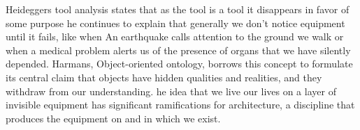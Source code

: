 Heideggers tool analysis states that as the tool is a tool it disappears in favor of some purpose he continues to explain that generally we don't notice equipment until it fails, like when An earthquake calls attention to the ground we walk or when a medical problem alerts us of the presence of organs that we have silently depended\cite{Harman2011}.
Harmans, Object-oriented ontology, borrows this concept to formulate its central claim that objects have hidden qualities and realities, and they withdraw from our understanding.\cite{Gage2015}
he idea that we live our lives on a layer of invisible equipment has significant ramifications for architecture, a discipline that produces the equipment on and in which we exist.\cite{Gage2015}
